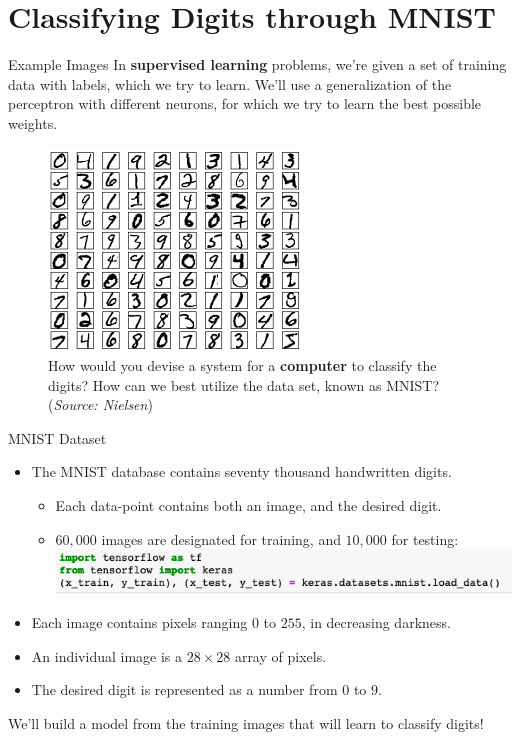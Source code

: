 \documentclass[xcolor=dvipsnames, fontsize=11pt, %
pagesize, %
parskip=half-, t]{beamer}
\begin{document}
\section{Classifying Digits through MNIST}
\begin{frame}[c]{Example Images}
In \textbf{supervised learning} problems, we're given a set of training data with labels, which we try to learn. We'll use a generalization of the perceptron with different neurons, for which we try to learn the best possible weights. \pause 
\begin{figure} 
\center
\includegraphics{mnist_100_digits.png}
\caption{How would you devise a system for a \textbf{computer} to classify the digits? How can we best utilize the data set, known as MNIST?  (\textit{Source: Nielsen}) }
\end{figure}
\end{frame}

\begin{frame}[c]{MNIST Dataset}
\begin{itemize}
\item The MNIST database contains seventy thousand handwritten digits.  \pause 
\begin{itemize}
\item Each data-point contains both an image, and the desired digit.
\item $60,000$ images are designated for training, and $10,000$ for testing:
\includegraphics[scale=0.42]{load.png}
\end{itemize} \pause 
\item Each image contains pixels ranging $0$ to $255$, in decreasing darkness. \pause
\item  An individual image is a $28\times 28$ array of pixels.\pause  
\item The desired digit is represented as a number from $0$ to $9$. \pause 
\end{itemize}
We'll build a model from the training images that will learn to classify digits!
\end{frame}
\end{document}
